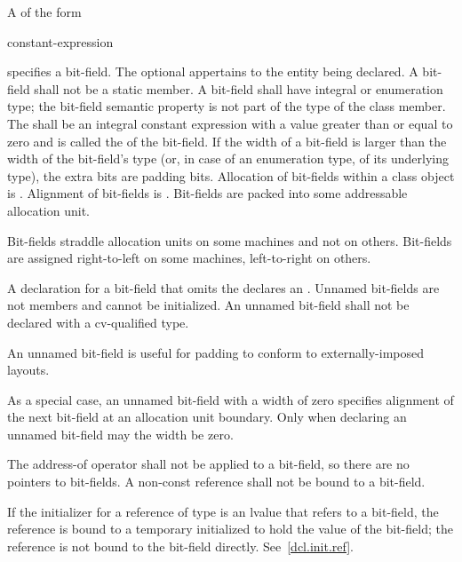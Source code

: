 \pnum
A  of the form
\begin{ncsimplebnf}
  \terminal{:} constant-expression 
\end{ncsimplebnf}
%
%
specifies a bit-field.
The optional  appertains
to the entity being declared.
A bit-field shall not be a static member.
%
A bit-field shall have integral or enumeration type;
the bit-field semantic property is not part of the type of the class member.
The  shall be an integral constant expression
with a value greater than or equal to zero and
is called the  of the bit-field.
If the width of a bit-field is larger than
the width of the bit-field's type
(or, in case of an enumeration type, of its underlying type),
the extra bits are padding bits.
%
Allocation of bit-fields within a class object is
.
%
Alignment of bit-fields is .
%
Bit-fields are packed into some addressable allocation unit.
\begin{note}
Bit-fields straddle allocation units on some machines and not on others.
Bit-fields are assigned right-to-left on some machines, left-to-right on
others.
\end{note}

\pnum
{}%
A declaration for a bit-field that omits the 
declares an . Unnamed bit-fields are not
members and cannot be initialized.
An unnamed bit-field shall not be declared with a cv-qualified type.
\begin{note}
An unnamed bit-field is useful for padding to conform to
externally-imposed layouts.
\end{note}
%
%
As a special case, an unnamed bit-field with a width of zero specifies
alignment of the next bit-field at an allocation unit boundary. Only
when declaring an unnamed bit-field may the width be zero.

\pnum
{}%
The address-of operator \tcode{\&} shall not be applied to a bit-field,
so there are no pointers to bit-fields.
%
%
%
A non-const reference shall not be bound to a
bit-field.
\begin{note}
If the initializer for a reference of type   is
an lvalue that refers to a bit-field, the reference is bound to a
temporary initialized to hold the value of the bit-field; the reference
is not bound to the bit-field directly. See~\ref{dcl.init.ref}.
\end{note}

